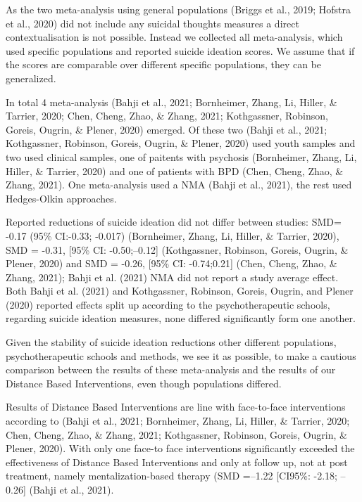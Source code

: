 \documentclass[
  english,
  man]{apa6}
\begin{document}
As the two meta-analysis using general populations (Briggs et al., 2019; Hofstra et al., 2020) did not include any suicidal thoughts measures a direct contextualisation is not possible. Instead we collected all meta-analysis, which used specific populations and reported suicide ideation scores. We assume that if the scores are comparable over different specific populations, they can be generalized.

In total 4 meta-analysis (Bahji et al., 2021; Bornheimer, Zhang, Li, Hiller, \& Tarrier, 2020; Chen, Cheng, Zhao, \& Zhang, 2021; Kothgassner, Robinson, Goreis, Ougrin, \& Plener, 2020) emerged. Of these two (Bahji et al., 2021; Kothgassner, Robinson, Goreis, Ougrin, \& Plener, 2020) used youth samples and two used clinical samples, one of paitents with psychosis (Bornheimer, Zhang, Li, Hiller, \& Tarrier, 2020) and one of patients with BPD (Chen, Cheng, Zhao, \& Zhang, 2021). One meta-analysis used a NMA (Bahji et al., 2021), the rest used Hedges-Olkin approaches.

Reported reductions of suicide ideation did not differ between studies: SMD= -0.17 (95\% CI:-0.33; -0.017) (Bornheimer, Zhang, Li, Hiller, \& Tarrier, 2020), SMD = -0.31, {[}95\% CI: -0.50;--0.12{]} (Kothgassner, Robinson, Goreis, Ougrin, \& Plener, 2020) and SMD = -0.26, {[}95\% CI: -0.74;0.21{]} (Chen, Cheng, Zhao, \& Zhang, 2021); Bahji et al. (2021) NMA did not report a study average effect. Both Bahji et al. (2021) and Kothgassner, Robinson, Goreis, Ougrin, and Plener (2020) reported effects split up according to the psychotherapeutic schools, regarding suicide ideation measures, none differed significantly form one another.

Given the stability of suicide ideation reductions other different populations, psychotherapeutic schools and methods, we see it as possible, to make a cautious comparison between the results of these meta-analysis and the results of our Distance Based Interventions, even though populations differed.

Results of Distance Based Interventions are line with face-to-face interventions according to (Bahji et al., 2021; Bornheimer, Zhang, Li, Hiller, \& Tarrier, 2020; Chen, Cheng, Zhao, \& Zhang, 2021; Kothgassner, Robinson, Goreis, Ougrin, \& Plener, 2020). With only one face-to face interventions significantly exceeded the effectiveness of Distance Based Interventions and only at follow up, not at post treatment, namely mentalization-based therapy (SMD =--1.22 {[}CI95\%: -2.18; --0.26{]} (Bahji et al., 2021).
\end{document}
